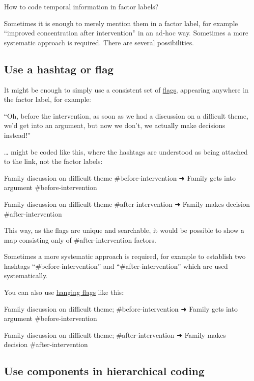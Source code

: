 \documentclass[
]{book}
\begin{document}
How to code temporal information in factor labels?

Sometimes it is enough to merely mention them in a factor label, for example ``improved concentration after intervention'' in an ad-hoc way. Sometimes a more systematic approach is required. There are several possibilities.

\hypertarget{use-a-hashtag-or-flag}{%
\subsection{Use a hashtag or flag}\label{use-a-hashtag-or-flag}}

It might be enough to simply use a consistent set of \href{https://causalmapdocumentation.blot.im/search?q=flag}{flags}, appearing anywhere in the factor label, for example:

``Oh, before the intervention, as soon as we had a discussion on a difficult theme, we'd get into an argument, but now we don't, we actually make decisions instead!''

\ldots{} might be coded like this, where the hashtags are understood as being attached to the link, not the factor labels:

Family discussion on difficult theme \#before-intervention ➜ Family gets into argument \#before-intervention

Family discussion on difficult theme \#after-intervention ➜ Family makes decision \#after-intervention

This way, as the flags are unique and searchable, it would be possible to show a map consisting only of \#after-intervention factors.

Sometimes a more systematic approach is required, for example to establish two hashtags ``\#before-intervention'' and ``\#after-intervention'' which are used systematically.

You can also use \protect\hyperlink{xhanging-flags}{hanging flags} like this:

Family discussion on difficult theme; \#before-intervention ➜ Family gets into argument \#before-intervention

Family discussion on difficult theme; \#after-intervention ➜ Family makes decision \#after-intervention

\hypertarget{use-components-in-hierarchical-coding}{%
\subsection{Use components in hierarchical coding}\label{use-components-in-hierarchical-coding}}
\end{document}
